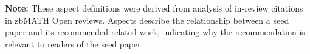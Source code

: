 \documentclass[sigconf,anonymous]{acmart}
\begin{document}
\noindent \textbf{Note:} These aspect definitions were derived from analysis of in-review citations in zbMATH Open reviews. Aspects describe the relationship between a seed paper and its recommended related work, indicating why the recommendation is relevant to readers of the seed paper.

\end{document}
